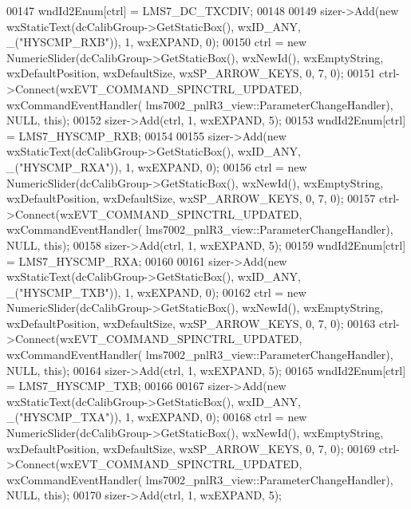 \begin{DoxyCode}
00147             wndId2Enum[ctrl] = LMS7_DC_TXCDIV;
00148 
00149             sizer->Add(\textcolor{keyword}{new} wxStaticText(dcCalibGroup->GetStaticBox(), wxID\_ANY, \_(\textcolor{stringliteral}{"HYSCMP\_RXB"})), 1, 
      wxEXPAND, 0);
00150             ctrl = \textcolor{keyword}{new} NumericSlider(dcCalibGroup->GetStaticBox(), wxNewId(), wxEmptyString, 
      wxDefaultPosition, wxDefaultSize, wxSP\_ARROW\_KEYS, 0, 7, 0);
00151             ctrl->Connect(wxEVT\_COMMAND\_SPINCTRL\_UPDATED, wxCommandEventHandler(
      lms7002_pnlR3_view::ParameterChangeHandler), NULL, \textcolor{keyword}{this});
00152             sizer->Add(ctrl, 1, wxEXPAND, 5);
00153             wndId2Enum[ctrl] = LMS7_HYSCMP_RXB;
00154 
00155             sizer->Add(\textcolor{keyword}{new} wxStaticText(dcCalibGroup->GetStaticBox(), wxID\_ANY, \_(\textcolor{stringliteral}{"HYSCMP\_RXA"})), 1, 
      wxEXPAND, 0);
00156             ctrl = \textcolor{keyword}{new} NumericSlider(dcCalibGroup->GetStaticBox(), wxNewId(), wxEmptyString, 
      wxDefaultPosition, wxDefaultSize, wxSP\_ARROW\_KEYS, 0, 7, 0);
00157             ctrl->Connect(wxEVT\_COMMAND\_SPINCTRL\_UPDATED, wxCommandEventHandler(
      lms7002_pnlR3_view::ParameterChangeHandler), NULL, \textcolor{keyword}{this});
00158             sizer->Add(ctrl, 1, wxEXPAND, 5);
00159             wndId2Enum[ctrl] = LMS7_HYSCMP_RXA;
00160 
00161             sizer->Add(\textcolor{keyword}{new} wxStaticText(dcCalibGroup->GetStaticBox(), wxID\_ANY, \_(\textcolor{stringliteral}{"HYSCMP\_TXB"})), 1, 
      wxEXPAND, 0);
00162             ctrl = \textcolor{keyword}{new} NumericSlider(dcCalibGroup->GetStaticBox(), wxNewId(), wxEmptyString, 
      wxDefaultPosition, wxDefaultSize, wxSP\_ARROW\_KEYS, 0, 7, 0);
00163             ctrl->Connect(wxEVT\_COMMAND\_SPINCTRL\_UPDATED, wxCommandEventHandler(
      lms7002_pnlR3_view::ParameterChangeHandler), NULL, \textcolor{keyword}{this});
00164             sizer->Add(ctrl, 1, wxEXPAND, 5);
00165             wndId2Enum[ctrl] = LMS7_HYSCMP_TXB;
00166 
00167             sizer->Add(\textcolor{keyword}{new} wxStaticText(dcCalibGroup->GetStaticBox(), wxID\_ANY, \_(\textcolor{stringliteral}{"HYSCMP\_TXA"})), 1, 
      wxEXPAND, 0);
00168             ctrl = \textcolor{keyword}{new} NumericSlider(dcCalibGroup->GetStaticBox(), wxNewId(), wxEmptyString, 
      wxDefaultPosition, wxDefaultSize, wxSP\_ARROW\_KEYS, 0, 7, 0);
00169             ctrl->Connect(wxEVT\_COMMAND\_SPINCTRL\_UPDATED, wxCommandEventHandler(
      lms7002_pnlR3_view::ParameterChangeHandler), NULL, \textcolor{keyword}{this});
00170             sizer->Add(ctrl, 1, wxEXPAND, 5);

\end{DoxyCode}
